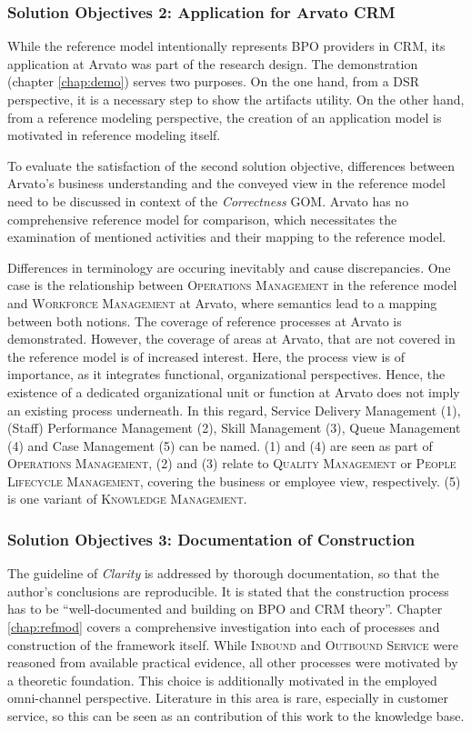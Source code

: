 \subsubsection{Solution Objectives 2: Application for Arvato CRM}

While the reference model intentionally represents BPO providers in CRM, its application at Arvato was part of the research design. The demonstration (\cf chapter \ref{chap:demo}) serves two purposes. On the one hand, from a \acrshort{DSR} perspective, it is a necessary step to show the artifacts utility. On the other hand, from a reference modeling perspective, the creation of an application model is motivated in reference modeling itself. 

To evaluate the satisfaction of the second solution objective, differences between Arvato's business understanding and the conveyed view in the reference model need to be discussed in context of the \textit{Correctness} \acrshort{GOM}. Arvato has no comprehensive reference model for comparison, which necessitates the examination of mentioned activities and their mapping to the reference model. 

Differences in terminology are occuring inevitably and cause discrepancies. One case is the relationship between \textsc{Operations Management} in the reference model and \textsc{Workforce Management} at Arvato, where semantics lead to a mapping between both notions. The coverage of reference processes at Arvato is demonstrated. However, the coverage of areas at Arvato, that are not covered in the reference model is of increased interest. Here, the process view is of importance, as it integrates functional, organizational perspectives. Hence, the existence of a dedicated organizational unit or function at Arvato does not imply an existing process underneath. In this regard, Service Delivery Management (1), (Staff) Performance Management (2), Skill Management (3), Queue Management (4) and Case Management (5) can be named. (1) and (4) are seen as part of \textsc{Operations Management}, (2) and (3) relate to \textsc{Quality Management} or \textsc{People Lifecycle Management}, covering the business or employee view, respectively. (5) is one variant of \textsc{Knowledge Management}. 


\subsubsection{Solution Objectives 3: Documentation of Construction}
The guideline of \textit{Clarity} is addressed by thorough documentation, so that the author's conclusions are reproducible.  
It is stated that the construction process has to be \enquote{well-documented and building on \acrshort{BPO} and \acrshort{CRM} theory}. Chapter \ref{chap:refmod} covers a comprehensive investigation into each of processes and construction of the framework itself. While \textsc{Inbound} and \textsc{Outbound Service} were reasoned from available practical evidence, all other processes were motivated by a theoretic foundation. This choice is additionally motivated in the employed omni-channel perspective. Literature in this area is rare, especially in customer service, so this can be seen as an  contribution of this work to the knowledge base. 

